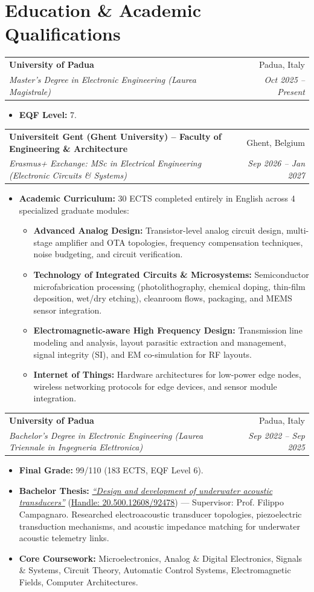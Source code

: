 \documentclass[10pt,a4paper]{article}
\makeatletter
\newcommand{\resumeItem}[1]{%
  \item\small{#1}%
}
\newcommand{\resumeSubheading}[4]{%
  \vspace{1.5pt}
  \noindent\begin{tabular*}{\textwidth}[t]{@{}l@{\extracolsep{\fill}}r@{}}
    \textbf{#1} & \textcolor{secondary}{\small #2} \\
    \textit{\small #3} & \textcolor{secondary}{\textit{\small #4}} \\
  \end{tabular*}\vspace{-2pt}
}
\newcommand{\resumeItemListStart}{\begin{itemize}[leftmargin=1.15em, itemsep=2.2pt, topsep=1.5pt, parsep=0pt]}
\newcommand{\resumeItemListEnd}{\end{itemize}\vspace{2pt}}
\makeatother
\begin{document}
\section{Education \& Academic Qualifications}

\resumeSubheading
  {University of Padua}{Padua, Italy}
  {Master's Degree in Electronic Engineering (Laurea Magistrale)}{Oct 2025 -- Present}
  \resumeItemListStart
    \resumeItem{\textbf{EQF Level:} 7.}
  \resumeItemListEnd

\resumeSubheading
  {Universiteit Gent (Ghent University) -- Faculty of Engineering \& Architecture}{Ghent, Belgium}
  {Erasmus+ Exchange: MSc in Electrical Engineering (Electronic Circuits \& Systems)}{Sep 2026 -- Jan 2027}
  \resumeItemListStart
    \resumeItem{\textbf{Academic Curriculum:} 30 ECTS completed entirely in English across 4 specialized graduate modules:}
    \begin{itemize}[leftmargin=1.2em, itemsep=2pt, topsep=1pt]
      \small
      \item \textbf{Advanced Analog Design:} Transistor-level analog circuit design, multi-stage amplifier and OTA topologies, frequency compensation techniques, noise budgeting, and circuit verification.
      \item \textbf{Technology of Integrated Circuits \& Microsystems:} Semiconductor microfabrication processing (photolithography, chemical doping, thin-film deposition, wet/dry etching), cleanroom flows, packaging, and MEMS sensor integration.
      \item \textbf{Electromagnetic-aware High Frequency Design:} Transmission line modeling and analysis, layout parasitic extraction and management, signal integrity (SI), and EM co-simulation for RF layouts.
      \item \textbf{Internet of Things:} Hardware architectures for low-power edge nodes, wireless networking protocols for edge devices, and sensor module integration.
    \end{itemize}
  \resumeItemListEnd

\resumeSubheading
  {University of Padua}{Padua, Italy}
  {Bachelor's Degree in Electronic Engineering (Laurea Triennale in Ingegneria Elettronica)}{Sep 2022 -- Sep 2025}
  \resumeItemListStart
    \resumeItem{\textbf{Final Grade:} 99/110 (183 ECTS, EQF Level 6).}
    \resumeItem{\textbf{Bachelor Thesis:} \href{https://hdl.handle.net/20.500.12608/92478}{\textit{``Design and development of underwater acoustic transducers''}} (\href{https://hdl.handle.net/20.500.12608/92478}{Handle: 20.500.12608/92478}) --- Supervisor: Prof. Filippo Campagnaro. Researched electroacoustic transducer topologies, piezoelectric transduction mechanisms, and acoustic impedance matching for underwater acoustic telemetry links.}
    \resumeItem{\textbf{Core Coursework:} Microelectronics, Analog \& Digital Electronics, Signals \& Systems, Circuit Theory, Automatic Control Systems, Electromagnetic Fields, Computer Architectures.}
  \resumeItemListEnd
\end{document}

